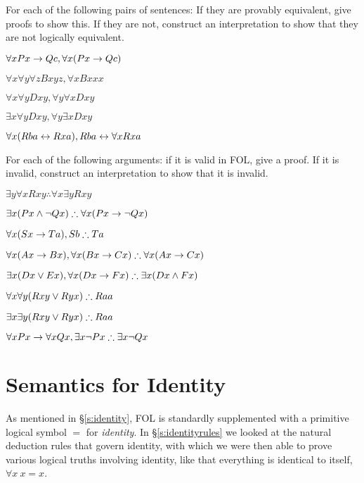 \problempart
\label{pr.FOLequivornot}
For each of the following pairs of sentences: If they are provably equivalent, give proofs to show this. If they are not, construct an interpretation to show that they are not logically equivalent.
\begin{earg}
\item $\forall x Px \rightarrow Qc, \forall x (Px \rightarrow Qc)$
\item $\forall x\forall y \forall z Bxyz, \forall x Bxxx$
\item $\forall x\forall y Dxy, \forall y\forall x Dxy$
\item $\exists x\forall y Dxy, \forall y\exists x Dxy$
\item $\forall x (Rba \leftrightarrow Rxa), Rba \leftrightarrow \forall x Rxa$
\end{earg}

\problempart
\label{pr.FOLvalidornot}
For each of the following arguments: if it is valid in FOL, give a proof. If it is invalid, construct an interpretation to show that it is invalid.
\begin{earg}
\item $\exists y\forall x Rxy \therefore \forall x\exists y Rxy$
\item $\exists x(Px \wedge \neg Qx) \therefore \forall x(Px \rightarrow \neg Qx)$
\item $\forall x(Sx \rightarrow Ta), Sb \therefore Ta$
\item $\forall x(Ax\rightarrow Bx), \forall x(Bx \rightarrow Cx) \therefore \forall x(Ax \rightarrow Cx)$
\item $\exists x(Dx \vee Ex), \forall x(Dx \rightarrow Fx) \therefore \exists x(Dx \wedge Fx)$
\item $\forall x\forall y(Rxy \vee Ryx) \therefore Raa$
\item $\exists x\exists y(Rxy \vee Ryx) \therefore Raa$
\item $\forall x Px \rightarrow \forall x Qx, \exists x \neg Px \therefore \exists x \neg Qx$
\end{earg}


\section{Semantics for Identity}

As mentioned in  \S\ref{s:identity}, FOL is standardly supplemented with a primitive logical symbol $=$ for \emph{identity}. In \S\ref{s:identityrules} we looked at the natural deduction rules that govern identity, with which we were then able to prove various logical truths involving identity, like that everything is identical to itself, $\forall x  \ x=x$.

